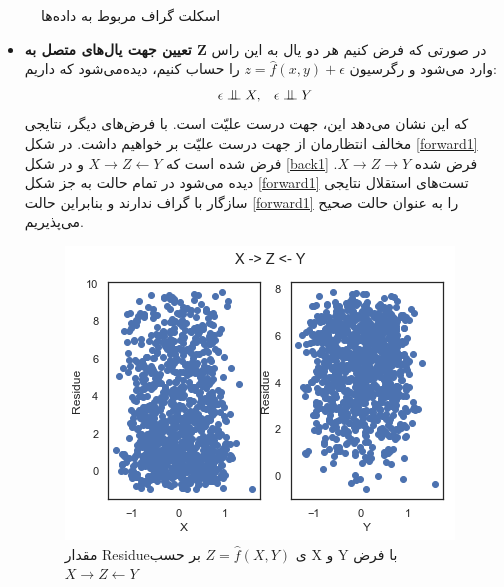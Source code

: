 \documentclass{article}
\begin{document}
\begin{figure}[h]
\caption{اسکلت گراف مربوط به داده‌ها}
\label{skeleton}
\end{figure}
\vspace{0.1cm}
\begin{itemize}
\item	\textbf{ تعیین جهت یال‌های متصل به Z}	
در صورتی که فرض کنیم هر دو یال به این راس وارد می‌شود و رگرسیون
$z = \hat{f} (x, y) + \epsilon$
را حساب کنیم، دیده‌می‌شود که داریم:
$$\epsilon \bigCI X, \; \;\; \epsilon \bigCI Y$$
که این نشان می‌دهد این، جهت درست علیّت است. با فرض‌های دیگر، نتایجی مخالف انتظارمان از جهت درست علیّت بر خواهیم داشت.
در شکل
\eqref{forward1}
فرض شده است که $X \rightarrow Z \leftarrow Y$	و در شکل 
\eqref{back1}
فرض شده 
$X \rightarrow Z \rightarrow Y$.
دیده می‌شود در تمام حالت به جز شکل
\eqref{forward1}
تست‌های استقلال نتایجی سازگار با گراف ندارند و بنابراین حالت 
\eqref{forward1}
را به عنوان حالت صحیح می‌پذیریم.

\begin{figure}[h]
\includegraphics[scale=0.455]{b1.png}
\caption{
مقدار Residueی
$Z = \hat{f}(X,Y)$
بر حسب X و Y با فرض 
$X \rightarrow Z \leftarrow Y$	
}
\label{forward1}
\end{figure}


\end{itemize}
\end{document}
